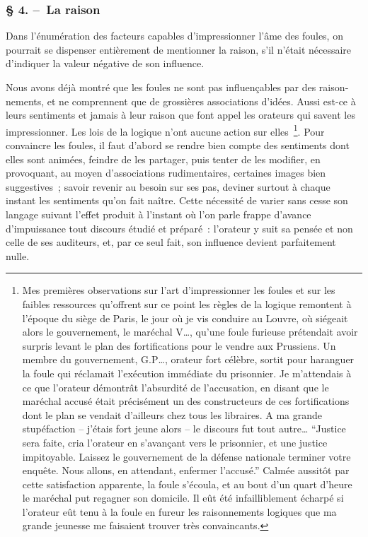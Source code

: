 \documentclass[french,twoside]{book} %
\begin{document}
\subsubsection[{§ 4. – La raison}]{§ 4. – La raison}
\noindent Dans l’énumération des facteurs capables d’impressionner l’âme des foules, on pourrait se dispenser entièrement de mentionner la raison, s’il n’était nécessaire d’indiquer la valeur négative de son influence.\par
Nous avons déjà montré que les foules ne sont pas influençables par des raison­nements, et ne comprennent que de grossières associations d’idées. Aussi est-ce à leurs sentiments et jamais à leur raison que font appel les orateurs qui savent les impressionner. Les lois de la logique n’ont aucune action sur elles \footnote{Mes premières observations sur l’art d’impressionner les foules et sur les faibles ressources qu’offrent sur ce point les règles de la logique remontent à l’époque du siège de Paris, le jour où je vis conduire au Louvre, où siégeait alors le gouvernement, le maréchal V…, qu’une foule furieuse prétendait avoir surpris levant le plan des fortifications pour le vendre aux Prussiens. Un membre du gouvernement, G.P…, orateur fort célèbre, sortit pour haranguer la foule qui récla­mait l’exécution immédiate du prisonnier. Je m’attendais à ce que l’orateur démontrât l’absurdité de l’accusation, en disant que le maréchal accusé était précisément un des constructeurs de ces fortifi­cations dont le plan se vendait d’ailleurs chez tous les libraires. A ma grande stupéfaction – j’étais fort jeune alors – le discours fut tout autre… “Justice sera faite, cria l’orateur en s’avançant vers le prisonnier, et une justice impitoyable. Laissez le gouvernement de la défense nationale terminer votre enquête. Nous allons, en attendant, enfermer l’accusé.” Calmée aussitôt par cette satisfaction apparente, la foule s’écoula, et au bout d’un quart d’heure le maréchal put regagner son domicile. Il eût été infaillible­ment écharpé si l’orateur eût tenu à la foule en fureur les raisonnements logiques que ma grande jeunesse me faisaient trouver très convaincants.}. Pour convaincre les foules, il faut d’abord se rendre bien compte des sentiments dont elles sont animées, feindre de les partager, puis tenter de les modifier, en provoquant, au moyen d’associations rudimentaires, certaines images bien suggestives ; savoir revenir au besoin sur ses pas, deviner surtout à chaque instant les sentiments qu’on fait naître. Cette nécessité de varier sans cesse son langage suivant l’effet produit à l’instant où l’on parle frappe d’avance d’impuissance tout discours étudié et préparé : l’orateur y suit sa pensée et non celle de ses auditeurs, et, par ce seul fait, son influence devient parfaitement nulle.\par
\end{document}
